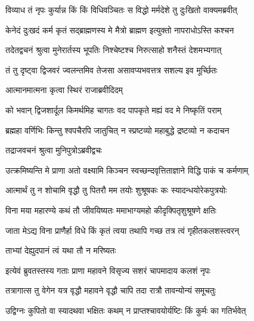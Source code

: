 \twolineshloka
{विव्याध तं नृपः कुर्यान्न किं किं विधिवञ्चितः}
{स विद्धो मर्मदेशे तु दुःखितो वाक्यमब्रवीत्} %



\twolineshloka
{केनेदं दुःखदं कर्म कृतं सद्ब्राह्मणस्य मे}
{मैत्रो ब्राह्मण इत्युक्तो नापराधोऽस्ति कश्चन} %



\twolineshloka
{तदेतद्वचनं श्रुत्वा मुनेरार्तस्य भूपतिः}
{निश्चेष्टश्च निरुत्साहो शनैस्तं देशमभ्यगात्} %

\twolineshloka
{तं तु दृष्ट्वा द्विजवरं ज्वलन्तमिव तेजसा}
{असावप्यभवत्तत्र सशल्य इव मूर्च्छितः} %

\onelineshloka
{आत्मानमात्मना कृत्वा स्थिरं राजाब्रवीदिदम्}%



\twolineshloka
{को भवान् द्विजशार्दूल किमर्थमिह चागतः}
{वद पापकृते मह्यं वद मे निष्कृतिं पराम्} %

\twolineshloka
{ब्रह्महा वर्णिभिः किन्तु श्वपचैरपि जातुचित्}
{न स्प्रष्टव्यो महाबुद्धे द्रष्टव्यो न कदाचन} %



\onelineshloka
{तद्राजवचनं श्रुत्वा मुनिपुत्रोऽब्रवीद्वचः}%



\twolineshloka
{उत्क्रमिष्यन्ति मे प्राणा अतो वक्ष्यामि किञ्चन}
{स्वच्छन्दवृत्तिताज्ञाने विद्धि पाकं च कर्मणाम्} %

\twolineshloka
{आत्मार्थं तु न शोचामि वृद्धौ तु पितरौ मम}
{तयोः शुश्रूषकः कः स्यादन्धयोरेकपुत्रयोः} %

\twolineshloka
{विना मया महारण्ये कथं तौ जीवयिष्यतः}
{ममाभाग्यमहो कीदृक्पितृशुश्रूषणे क्षतिः} %

\twolineshloka
{जाता मेऽद्य विना प्राणैर्हा विधे किं कृतं त्वया}
{तथापि गच्छ तत्र त्वं गृहीतकलशस्त्वरन्} %

\onelineshloka
{ताभ्यां देह्युदपानं त्वं यथा तौ न मरिष्यतः}%



\twolineshloka
{इत्येवं ब्रुवतस्तस्य गताः प्राणा महावने}
{विसृज्य सशरं चापमादाय कलशं नृपः} %

\twolineshloka
{तत्रागात्स तु वेगेन यत्र वृद्धौ महावने}
{वृद्धौ चापि तदा रात्रौ तावन्योन्यं समूचतुः} %



\twolineshloka
{उद्विग्नः कुपितो वा स्यादथवा भक्षितः कथम्}
{न प्राप्तश्चावयोर्यष्टिः किं कुर्मः का गतिर्भवेत्} %

